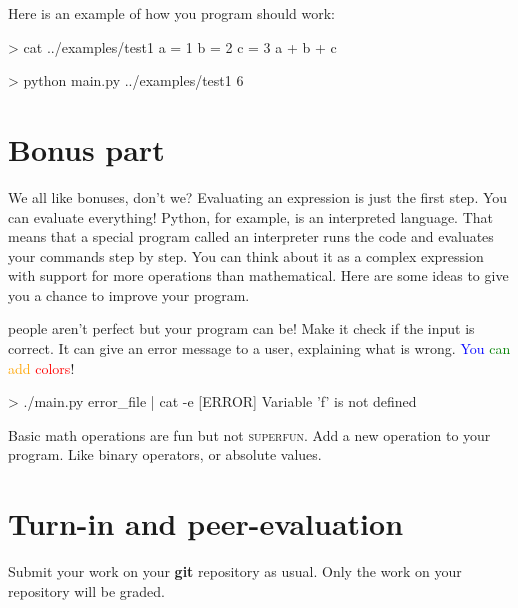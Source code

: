 \documentclass{42-en}
\begin{document}
        Here is an example of how you program should work:
        
        \begin{42console}
> cat ../examples/test1
a = 1
b = 2
c = 3
a + b + c

> python main.py ../examples/test1
6
\end{42console}


\chapter{Bonus part}

    We all like bonuses, don't we? Evaluating an expression is just the first step.
    You can evaluate everything! Python, for example, is an interpreted language.
    That means that a special program called an interpreter runs the code and evaluates your commands step by step. You can think about it as a complex expression with support for more operations than mathematical. Here are some ideas to give you a chance to improve your program.
     \begin{description}\itemsep3pt
        \item [Errors:] people aren't perfect but your program can be! Make it check if
        the input is correct. It can give an error message to a user, explaining what is wrong.
        \textcolor{blue}{You} \textcolor{green}{can} \textcolor{orange}{add} \textcolor{red}{colors}!
                \begin{42console}
> ./main.py error_file | cat -e
[ERROR] Variable 'f' is not defined
\end{42console}
        \item [More operations:] Basic math operations are fun but not \textsc{superfun}.
        Add a new operation to your program. Like binary operators, or absolute values.\\
    \end{description}
    

\chapter{Turn-in and peer-evaluation}

    Submit your work on your \textbf{git} repository as usual. Only the work on your 
    repository will be graded.

\end{document}
